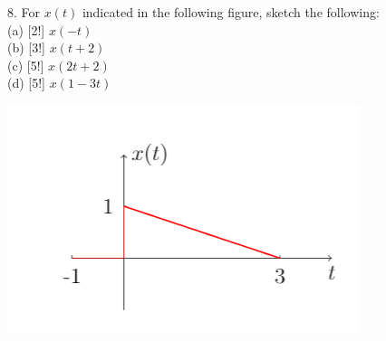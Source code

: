 \documentclass[12pt,a4paper]{article}
\begin{document}
\begin{tcolorbox}[colback = white]
8. For $x(t)$ indicated in the following figure, sketch the following:\\
(a) [2!] $x(-t)$\\
(b) [3!] $x(t+2)$\\
(c) [5!] $x(2t+2)$\\
(d) [5!] $x(1-3t)$\\
\begin{center}
\includegraphics[scale=1]{problem8.png}
\end{center}
\end{tcolorbox}
\end{document}
